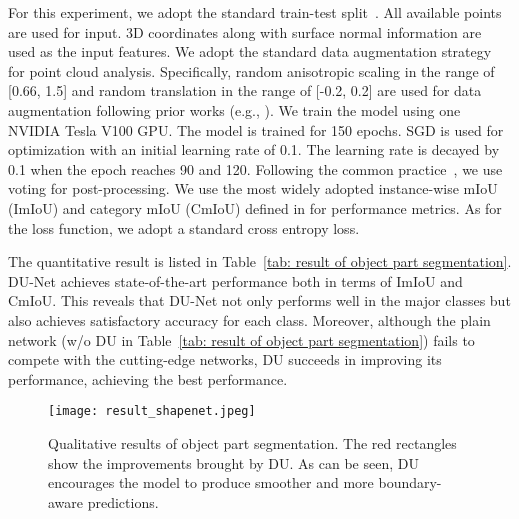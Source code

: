 \documentclass[a4paper,fleqn]{cas-dc}
\begin{document}
For this experiment, we adopt the standard train-test split~\cite{qi2017pointnet++}. All available points are used for input. 3D coordinates along with surface normal information are used as the input features. We adopt the standard data augmentation strategy for point cloud analysis. Specifically, random anisotropic scaling in the range of [0.66, 1.5] and random translation in the range of [-0.2, 0.2] are used for data augmentation following prior works (e.g., \cite{wang2019dynamic}). We train the model using one NVIDIA Tesla V100 GPU. The model is trained for 150 epochs. SGD is used for optimization with an initial learning rate of 0.1. The learning rate is decayed by 0.1 when the epoch reaches 90 and 120. Following the common practice~\cite{thomas2019kpconv,liu2019relation,xu2021paconv}, we use voting for post-processing. We use the most widely adopted instance-wise mIoU (ImIoU) and category mIoU (CmIoU) defined in \cite{qi2017pointnet} for performance metrics. 
As for the loss function, we adopt a standard cross entropy loss.


The quantitative result is listed in Table~\ref{tab: result of object part segmentation}. DU-Net achieves state-of-the-art performance both in terms of ImIoU and CmIoU. This reveals that DU-Net not only performs well in the major classes but also achieves satisfactory accuracy for each class. Moreover, although the plain network (w/o DU in Table~\ref{tab: result of object part segmentation}) fails to compete with the cutting-edge networks, DU succeeds in improving its performance, achieving the best performance. 


\begin{figure}[t]
     \centering
    \texttt{[image: result\_shapenet.jpeg]}
    \caption{
        Qualitative results of object part segmentation. The red rectangles show the improvements brought by DU. As can be seen, DU encourages the model to produce smoother and more boundary-aware predictions.
    }
    \label{fig: qualitative results of object part segmentation}
\end{figure}
\end{document}
